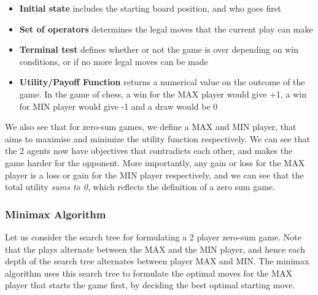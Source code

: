 \documentclass[12pt]{article}
\begin{document}
\begin{itemize}
\item \textbf{Initial state} includes the starting board position, and who goes first
\item \textbf{Set of operators} determines the legal moves that the current play can make
\item \textbf{Terminal test} defines whether or not the game is over depending on win conditions, or if no more legal moves can be made
\item \textbf{Utility/Payoff Function} returns a numerical value on the outcome of the game. In the game of chess, a win for the MAX player would give +1, a win for MIN player would give -1 and a draw would be 0
\end{itemize}

We also see that for zero-sum games, we define a MAX and MIN player, that aims to maximise and minimize the utility function respectively. We can see that the 2 agents now have objectives that contradicts each other, and makes the game harder for the opponent. More importantly, any gain or loss for the MAX player is a loss or gain for the MIN player respectively, and we can see that the total utility \textit{sums to 0}, which reflects the definition of a zero sum game.\\

\subsubsection{Minimax Algorithm}

Let us consider the search tree for formulating a 2 player zero-sum game. Note that the plays alternate between the MAX and the MIN player, and hence each depth of the search tree alternates between player MAX and MIN. The minimax algorithm uses this search tree to formulate the optimal moves for the MAX player that starts the game first, by deciding the best optimal starting move.
\end{document}
